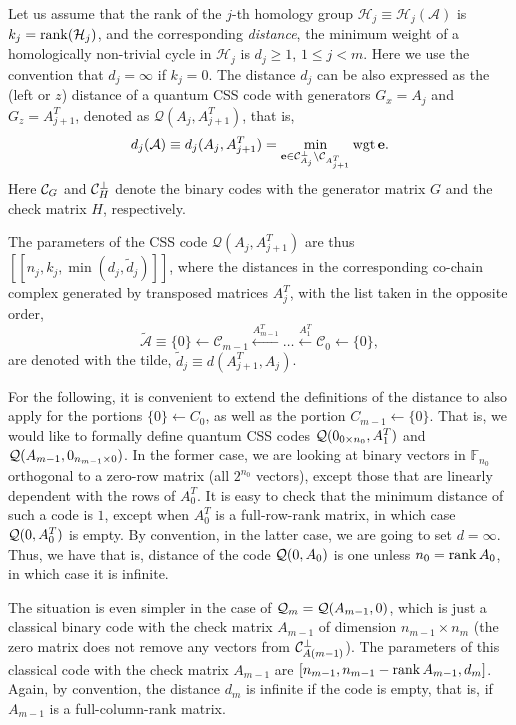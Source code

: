 \documentclass[aps,prb,12pt,tightenlines,%
notitlepage,longbibliography]{revtex4-1}
\begin{document}
Let us assume that the rank of the $j$-th homology group
$\mathcal{H}_j\equiv \mathcal{H}_j(\mathcal{A})$ is
$k_j=\mathop{\rm rank}(\mathcal{H}_j)$, and the corresponding \emph{distance}, the
minimum weight of a homologically non-trivial cycle in $\mathcal{H}_j$
is $d_j\ge1$, $1\le j<m$.  Here we use the convention that
$d_j=\infty$ if $k_j=0$.  The distance $d_j$ can be also expressed as
the (left or $z$) distance of a quantum CSS code with generators
$G_x=A_j$ and $G_z=A_{j+1}^T$, denoted as
$\mathcal{Q}(A_j,A_{j+1}^T)$, that is,
$$d_j(\mathcal{A})\equiv d_j(A_j,A_{j+1}^T) =\min_{\mathbf{e}\in\mathcal{C}_{A_j}^\perp\setminus\mathcal{C}_{A_{j+1}^T}}\mathop{\rm wgt}
\mathbf{e}.$$ 
Here ${\cal C}_G$ and ${\cal C}^\perp_H$  denote the
binary codes with the generator matrix $G$ and the check matrix $H$,
respectively. 

The parameters of the CSS code $\mathcal{Q}(A_j,A_{j+1}^T)$ are thus
$[[n_j,k_j,\min(d_j,\tilde{d}_{j})]]$, where the distances in the
corresponding co-chain complex generated by transposed matrices
$A_j^T$, with the list taken in the opposite order,
$$
\tilde{\mathcal{A}}\equiv \{0\}\leftarrow
\mathcal{C}_{m-1}\stackrel{A_{m-1}^T}\leftarrow \ldots
\stackrel{A_{1}^T}\leftarrow \mathcal{C}_0\leftarrow \{0\}, 
$$
are denoted with the tilde, $\tilde{d}_j\equiv d(A_{j+1}^T,A_j)$.

For the following, it is convenient to extend the definitions of the
distance to also apply for the portions $\{0\}\leftarrow{C}_0$, as
well as the portion $C_{m-1}\leftarrow\{0\}$.  That is, we would like
to formally define quantum CSS codes ${\cal Q}(0_{0\times n_0},A_1^T)$
and ${\cal Q}(A_{m-1},0_{n_{m-1}\times 0})$.  In the former case, we
are looking at binary vectors in $\mathbb{F}_{n_0}$ orthogonal to a
zero-row matrix (all $2^{n_0}$ vectors), except those that are
linearly dependent with the rows of $A_0^T$.  It is easy to check that
the minimum distance of such a code is $1$, except when $A_0^T$ is a
full-row-rank matrix, in which case ${\cal Q}(0,A_0^T)$ is empty.  By
convention, in the latter case, we are going to set $d=\infty$.  Thus,
we have  that is,
distance of the code ${\cal Q}(0,A_0)$ is one unless $n_0=\mathop{\rm rank} A_0$,
in which case it is infinite.   

The situation is even simpler in the case of
${\cal Q}_m={\cal Q}(A_{m-1},0)$, which is just a classical binary
code with the check matrix $A_{m-1}$ of dimension $n_{m-1}\times n_m$
(the zero matrix does not remove any vectors from
${\cal C}_{A(m-1)}^\perp$).  The parameters of this classical code
with the check matrix $A_{m-1}$ are
$[n_{m-1},n_{m-1}-\mathop{\rm rank} A_{m-1},d_m]$.  Again, by convention, the
distance $d_m$ is infinite if the code is empty, that is, if $A_{m-1}$
is a full-column-rank matrix.
\end{document}
